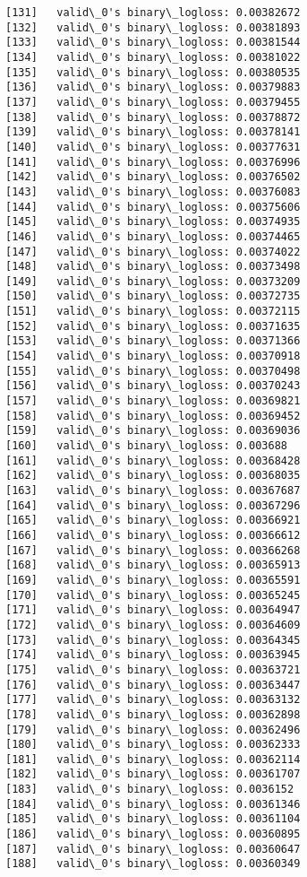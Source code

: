 \documentclass[11pt]{article}
\begin{document}
\begin{Verbatim}[commandchars=\\\{\}]
[131]	valid\_0's binary\_logloss: 0.00382672
[132]	valid\_0's binary\_logloss: 0.00381893
[133]	valid\_0's binary\_logloss: 0.00381544
[134]	valid\_0's binary\_logloss: 0.00381022
[135]	valid\_0's binary\_logloss: 0.00380535
[136]	valid\_0's binary\_logloss: 0.00379883
[137]	valid\_0's binary\_logloss: 0.00379455
[138]	valid\_0's binary\_logloss: 0.00378872
[139]	valid\_0's binary\_logloss: 0.00378141
[140]	valid\_0's binary\_logloss: 0.00377631
[141]	valid\_0's binary\_logloss: 0.00376996
[142]	valid\_0's binary\_logloss: 0.00376502
[143]	valid\_0's binary\_logloss: 0.00376083
[144]	valid\_0's binary\_logloss: 0.00375606
[145]	valid\_0's binary\_logloss: 0.00374935
[146]	valid\_0's binary\_logloss: 0.00374465
[147]	valid\_0's binary\_logloss: 0.00374022
[148]	valid\_0's binary\_logloss: 0.00373498
[149]	valid\_0's binary\_logloss: 0.00373209
[150]	valid\_0's binary\_logloss: 0.00372735
[151]	valid\_0's binary\_logloss: 0.00372115
[152]	valid\_0's binary\_logloss: 0.00371635
[153]	valid\_0's binary\_logloss: 0.00371366
[154]	valid\_0's binary\_logloss: 0.00370918
[155]	valid\_0's binary\_logloss: 0.00370498
[156]	valid\_0's binary\_logloss: 0.00370243
[157]	valid\_0's binary\_logloss: 0.00369821
[158]	valid\_0's binary\_logloss: 0.00369452
[159]	valid\_0's binary\_logloss: 0.00369036
[160]	valid\_0's binary\_logloss: 0.003688
[161]	valid\_0's binary\_logloss: 0.00368428
[162]	valid\_0's binary\_logloss: 0.00368035
[163]	valid\_0's binary\_logloss: 0.00367687
[164]	valid\_0's binary\_logloss: 0.00367296
[165]	valid\_0's binary\_logloss: 0.00366921
[166]	valid\_0's binary\_logloss: 0.00366612
[167]	valid\_0's binary\_logloss: 0.00366268
[168]	valid\_0's binary\_logloss: 0.00365913
[169]	valid\_0's binary\_logloss: 0.00365591
[170]	valid\_0's binary\_logloss: 0.00365245
[171]	valid\_0's binary\_logloss: 0.00364947
[172]	valid\_0's binary\_logloss: 0.00364609
[173]	valid\_0's binary\_logloss: 0.00364345
[174]	valid\_0's binary\_logloss: 0.00363945
[175]	valid\_0's binary\_logloss: 0.00363721
[176]	valid\_0's binary\_logloss: 0.00363447
[177]	valid\_0's binary\_logloss: 0.00363132
[178]	valid\_0's binary\_logloss: 0.00362898
[179]	valid\_0's binary\_logloss: 0.00362496
[180]	valid\_0's binary\_logloss: 0.00362333
[181]	valid\_0's binary\_logloss: 0.00362114
[182]	valid\_0's binary\_logloss: 0.00361707
[183]	valid\_0's binary\_logloss: 0.0036152
[184]	valid\_0's binary\_logloss: 0.00361346
[185]	valid\_0's binary\_logloss: 0.00361104
[186]	valid\_0's binary\_logloss: 0.00360895
[187]	valid\_0's binary\_logloss: 0.00360647
[188]	valid\_0's binary\_logloss: 0.00360349

\end{Verbatim}
\end{document}
